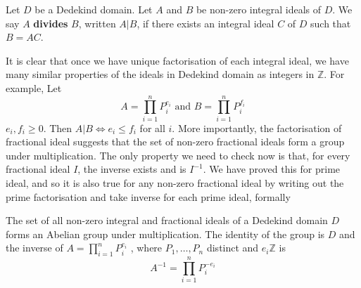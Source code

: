 \begin{definition} Let $D$ be a Dedekind domain. Let $A$ and $B$  be non-zero integral ideals of $D$. We say $A$
{\bf divides} $B$, written $A|B$, if there exists an integral ideal $C$ of $D$ such that $B=AC$.
\end{definition}
It is clear that once we have unique factorisation of each integral ideal, we have many similar properties of
the ideals in Dedekind domain as integers in $\mathbb{Z}$. For example, Let
$$A=\prod_{i=1}^n P_i^{e_i} \text{ and } B=\prod_{i=1}^n P_i ^{f_i}$$
$e_i,f_i \ge 0$. Then $A|B \iff e_i \le f_i$ for all $i$.
More importantly, the factorisation of fractional ideal suggests that the set of non-zero fractional ideals form a group under multiplication. The only property we need to check now is that, for every fractional ideal $I$, the inverse exists and is $I^{-1}$. We have proved this for prime ideal, and so it is also true for any non-zero fractional ideal by writing out the prime factorisation and take inverse for each prime ideal, formally
\begin{theorem} The set of all non-zero integral and fractional ideals of a Dedekind domain $D$ forms an
Abelian group under multiplication. The identity of the group is $D$ and the inverse of $A=\prod_{i=1}^nP_i^{e_i}$
, where $P_1,\ldots,P_n$ distinct and $e_i \mathbb{Z}$ is
$$A^{-1}=\prod_{i=1}^n P_i ^{-e_i}$$
\end{theorem}
